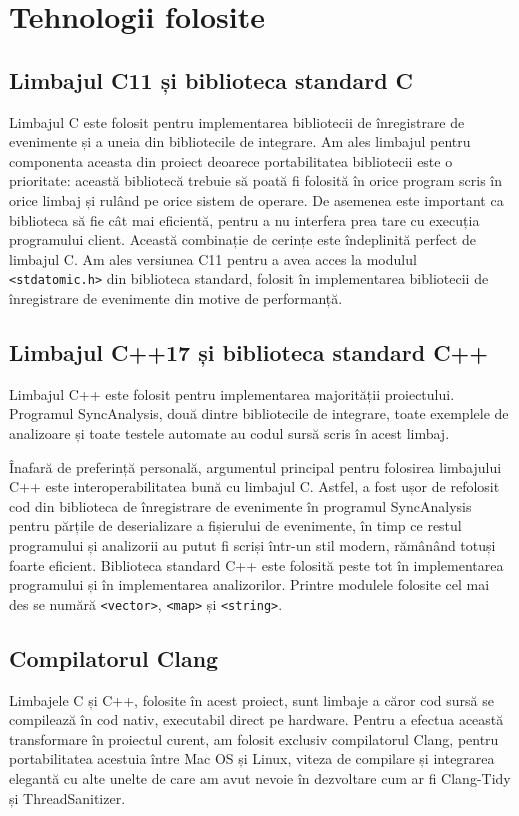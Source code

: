 \section{Tehnologii folosite}

\subsection{Limbajul C11 și biblioteca standard C}
Limbajul C\cite{C} este folosit pentru implementarea bibliotecii de
înregistrare de evenimente și a uneia din bibliotecile de integrare.
Am ales limbajul pentru componenta aceasta din proiect deoarece
portabilitatea bibliotecii este o prioritate: această bibliotecă trebuie
să poată fi folosită în orice program scris în orice limbaj și rulând pe
orice sistem de operare. De asemenea este important ca biblioteca să fie
cât mai eficientă, pentru a nu interfera prea tare cu execuția
programului client. Această combinație de cerințe este îndeplinită
perfect de limbajul C. Am ales versiunea C11 pentru a avea acces la
modulul \lstinline{<stdatomic.h>} din biblioteca standard, folosit în
implementarea bibliotecii de înregistrare de evenimente din motive de
performanță.

\subsection{Limbajul C++17 și biblioteca standard C++}
Limbajul C++\cite{CXX} este folosit pentru implementarea majorității
proiectului. Programul SyncAnalysis, două dintre bibliotecile de
integrare, toate exemplele de analizoare și toate testele automate au
codul sursă scris în acest limbaj.

Înafară de preferință personală, argumentul principal pentru folosirea
limbajului C++ este interoperabilitatea bună cu limbajul C. Astfel, a
fost ușor de refolosit cod din biblioteca de înregistrare de evenimente
în programul SyncAnalysis pentru părțile de deserializare a fișierului
de evenimente, în timp ce restul programului și analizorii au putut fi
scriși într-un stil modern, rămânând totuși foarte eficient. Biblioteca
standard C++ este folosită peste tot în implementarea programului și în
implementarea analizorilor. Printre modulele folosite cel mai des se
numără \lstinline{<vector>}, \lstinline{<map>} și \lstinline{<string>}.

\subsection{Compilatorul Clang}
Limbajele C și C++, folosite în acest proiect, sunt limbaje a căror cod
sursă se compilează în cod nativ, executabil direct pe hardware. Pentru
a efectua această transformare în proiectul curent, am folosit exclusiv
compilatorul Clang\cite{Clang}, pentru portabilitatea acestuia între Mac
OS și Linux, viteza de compilare și integrarea elegantă cu alte unelte
de care am avut nevoie în dezvoltare cum ar fi
Clang-Tidy\cite{ClangTidy} și ThreadSanitizer\cite{ThreadSanitizer}.

